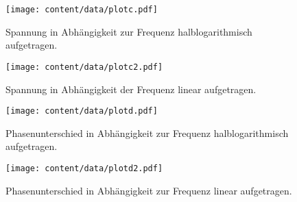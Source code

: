 \begin{figure}
    \centering
    \texttt{[image: content/data/plotc.pdf]}
    \caption{Spannung in Abhängigkeit zur Frequenz halblogarithmisch aufgetragen.}
    \label{fig:spannung_log}
\end{figure}

\begin{figure}
    \centering
    \texttt{[image: content/data/plotc2.pdf]}
    \caption{Spannung in Abhängigkeit der Frequenz linear aufgetragen.}
    \label{fig:spannung_lin}
\end{figure}

\begin{figure}
    \centering
    \texttt{[image: content/data/plotd.pdf]}
    \caption{Phasenunterschied in Abhängigkeit zur Frequenz halblogarithmisch aufgetragen.}
    \label{fig:phase_log}
\end{figure}
\begin{figure}
        \centering
        \texttt{[image: content/data/plotd2.pdf]}
        \caption{Phasenunterschied in Abhängigkeit zur Frequenz linear aufgetragen.} 
        \label{fig:phase_lin}
\end{figure}

